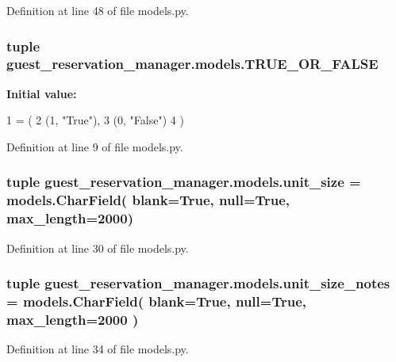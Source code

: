 Definition at line 48 of file models.\-py.

\hypertarget{namespaceguest__reservation__manager_1_1models_aa33338a7c5e0f3ec940572c2d8edc30d}{
\subsubsection[{T\-R\-U\-E\-\_\-\-O\-R\-\_\-\-F\-A\-L\-S\-E}]{\setlength{\rightskip}{0pt plus 5cm}tuple guest\-\_\-reservation\-\_\-manager.\-models.\-T\-R\-U\-E\-\_\-\-O\-R\-\_\-\-F\-A\-L\-S\-E}}\label{namespaceguest__reservation__manager_1_1models_aa33338a7c5e0f3ec940572c2d8edc30d}
{\bfseries Initial value\-:}
\begin{DoxyCode}
1 = (
2     (1, \textcolor{stringliteral}{"True"}),
3     (0, \textcolor{stringliteral}{"False"})
4 )
\end{DoxyCode}


Definition at line 9 of file models.\-py.

\hypertarget{namespaceguest__reservation__manager_1_1models_aa7ae6160b6e1afcef6f17094a6b97c9f}{
\subsubsection[{unit\-\_\-size}]{\setlength{\rightskip}{0pt plus 5cm}tuple guest\-\_\-reservation\-\_\-manager.\-models.\-unit\-\_\-size = models.\-Char\-Field( blank=True, null=True, max\-\_\-length=2000)}}\label{namespaceguest__reservation__manager_1_1models_aa7ae6160b6e1afcef6f17094a6b97c9f}


Definition at line 30 of file models.\-py.

\hypertarget{namespaceguest__reservation__manager_1_1models_ad7e520f1de790daa090b5c47daf1f386}{
\subsubsection[{unit\-\_\-size\-\_\-notes}]{\setlength{\rightskip}{0pt plus 5cm}tuple guest\-\_\-reservation\-\_\-manager.\-models.\-unit\-\_\-size\-\_\-notes = models.\-Char\-Field( blank=True, null=True, max\-\_\-length=2000 )}}\label{namespaceguest__reservation__manager_1_1models_ad7e520f1de790daa090b5c47daf1f386}


Definition at line 34 of file models.\-py.

